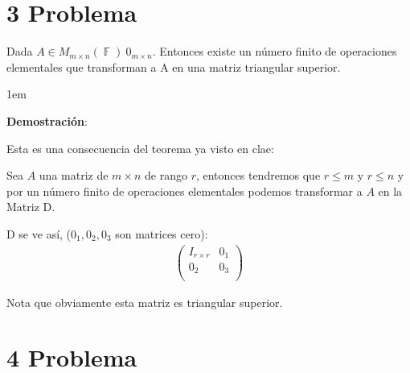 \documentclass[12pt, fleqn]{article}                             %
\newenvironment{SmallIndentation}[1][0.75em]                    %
        {\begin{adjustwidth}{#1}{}\begin{footnotesize}}             %
        {\end{footnotesize}\end{adjustwidth}}                       %
\theoremstyle{break}                                            %
\DeclareMathOperator \GenericField {\mathbb{F}}                 %
\newcommand{\pVector}[1]                                        %
        { \ensuremath{\begin{pmatrix}#1\end{pmatrix}} }             %
\begin{document}
\vspace{1em}
\section{3 Problema}

    Dada $A \in M_{m \times n}(\GenericField) \ 0_{m \times n}$. Entonces existe un número finito de
    operaciones elementales que transforman a A en una matriz triangular superior.

    \begin{SmallIndentation}[1em]
        \textbf{Demostración}:
        
        Esta es una consecuencia del teorema ya visto en clae:

        Sea $A$ una matriz de $m \times n$ de rango $r$, entonces
        tendremos que $r \leq m$ y $r \leq n$
        y por un número finito de operaciones elementales podemos transformar
        a $A$ en la Matriz D.

        D se ve así, ($0_1, 0_2, 0_3$ son matrices cero):
        \begin{align*}
            \pVector{
                I_{r \times r} & 0_1 \\
                0_2            & 0_3 \\
            }
        \end{align*}

        Nota que obviamente esta matriz es triangular superior.
    
    \end{SmallIndentation}



\clearpage
\section{4 Problema}
\end{document}
